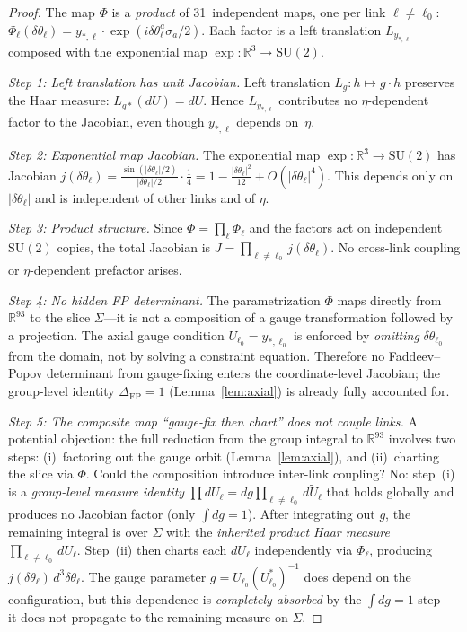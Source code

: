 \documentclass[11pt]{article}
\theoremstyle{definition}
\newcommand{\SU}{\mathrm{SU}}
\newcommand{\R}{\mathbb{R}}
\begin{document}
\begin{proof}
The map $\Phi$ is a \emph{product} of 31~independent maps,
one per link $\ell\ne\ell_0$:
$\Phi_\ell(\delta\theta_\ell)
=y_{*,\ell}\cdot\exp(i\delta\theta_\ell^a\sigma_a/2)$.
Each factor is a left translation $L_{y_{*,\ell}}$ composed with
the exponential map $\exp:\R^3\to\SU(2)$.

\emph{Step 1: Left translation has unit Jacobian.}
Left translation $L_g:h\mapsto g\cdot h$ preserves the Haar
measure: $L_{g*}(dU)=dU$.  Hence $L_{y_{*,\ell}}$ contributes
no $\eta$-dependent factor to the Jacobian, even though
$y_{*,\ell}$ depends on~$\eta$.

\emph{Step 2: Exponential map Jacobian.}
The exponential map $\exp:\R^3\to\SU(2)$ has Jacobian
$j(\delta\theta_\ell)
=\frac{\sin(|\delta\theta_\ell|/2)}{|\delta\theta_\ell|/2}
\cdot\frac{1}{4}
=1-\frac{|\delta\theta_\ell|^2}{12}+O(|\delta\theta_\ell|^4)$.
This depends only on $|\delta\theta_\ell|$ and is
independent of other links and of $\eta$.

\emph{Step 3: Product structure.}
Since $\Phi=\prod_\ell\Phi_\ell$ and the factors act on
independent $\SU(2)$ copies, the total Jacobian is
$J=\prod_{\ell\ne\ell_0}j(\delta\theta_\ell)$.
No cross-link coupling or $\eta$-dependent prefactor arises.

\emph{Step 4: No hidden FP determinant.}
The parametrization $\Phi$ maps directly from $\R^{93}$ to the
slice $\Sigma$---it is not a composition of a gauge
transformation followed by a projection.  The axial gauge
condition $U_{\ell_0}=y_{*,\ell_0}$ is enforced by
\emph{omitting} $\delta\theta_{\ell_0}$ from the domain, not
by solving a constraint equation.  Therefore no Faddeev--Popov
determinant from gauge-fixing enters the coordinate-level
Jacobian; the group-level identity
$\Delta_{\mathrm{FP}}=1$ (Lemma~\ref{lem:axial}) is already
fully accounted for.

\emph{Step 5: The composite map ``gauge-fix then chart''
does not couple links.}
A potential objection: the full reduction from the group integral
to $\R^{93}$ involves two steps: (i)~factoring out the gauge orbit
(Lemma~\ref{lem:axial}), and (ii)~charting the slice via $\Phi$.
Could the composition introduce inter-link coupling?
No: step~(i) is a \emph{group-level measure identity}
$\prod dU_\ell = dg\prod_{\ell\ne\ell_0}d\tilde{U}_\ell$
that holds globally and produces no Jacobian factor
(only $\int dg=1$).  After integrating out $g$, the remaining
integral is over $\Sigma$ with the \emph{inherited product Haar
measure} $\prod_{\ell\ne\ell_0}dU_\ell$.  Step~(ii) then charts
each $dU_\ell$ independently via $\Phi_\ell$, producing
$j(\delta\theta_\ell)\,d^3\delta\theta_\ell$.
The gauge parameter $g=U_{\ell_0}(U_{\ell_0}^*)^{-1}$ does
depend on the configuration, but this dependence is
\emph{completely absorbed} by the $\int dg=1$ step---it does
not propagate to the remaining measure on $\Sigma$.
\end{proof}
\end{document}
